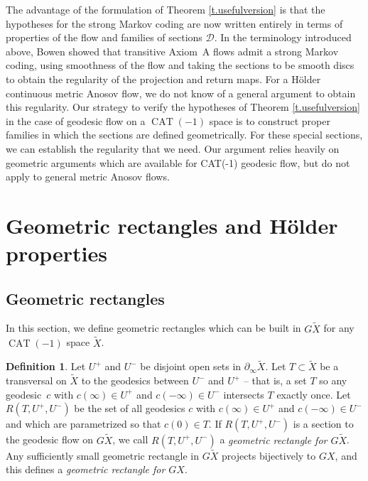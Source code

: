 \documentclass[JEP,XML,SOM,Unicode,NoFloatCountersInSection]{cedram}
\let\mathcal\mathscr
\theoremstyle{definition}
\newtheorem{defn}[thm]{Definition}
\numberwithin{equation}{section}
\DeclareMathOperator{\CAT}{CAT}
\newcommand\DDD{\mathcal D}
\begin{document}
The advantage of the formulation of Theorem \ref{t.usefulversion} is that the hypotheses for the strong Markov coding are now written entirely in terms of properties of the flow and families of sections $\DDD$. In the terminology introduced above, Bowen showed that transitive Axiom~A flows admit a strong Markov coding, using smoothness of the flow and taking the sections to be smooth discs to obtain the regularity of the projection and return maps. For a Hölder continuous metric Anosov flow, we do not know of a general argument to obtain this regularity. Our strategy to verify the hypotheses of Theorem \ref{t.usefulversion} in the case of geodesic flow on a $\CAT(-1)$ space is to construct proper families in which the sections are defined geometrically. For these special sections, we can establish the regularity that we need. Our argument relies heavily on geometric arguments which are available for CAT(-1) geodesic flow, but do not apply to general metric Anosov flows.

\section{Geometric rectangles and Hölder properties}\label{sec:good rectangles}

\subsection{Geometric rectangles} \label{subsec:geom rect}

In this section, we define geometric rectangles which can be built in $G\tilde X$ for any $\CAT(-1)$ space $\tilde X$.

\begin{defn}\label{def:geom rectangle}
Let $U^+$ and $U^-$ be disjoint open sets in $\partial_\infty \tilde X$. Let $T \subset \tilde X$ be a transversal on $\tilde X$ to the geodesics between $U^-$ and $U^+$ -- that is, a set $T$ so any geodesic~$c$ with $c(\infty)\in U^+$ and $c(-\infty) \in U^-$ intersects $T$ exactly once. Let $R(T, U^+, U^-)$ be the set of all geodesics $c$ with $c(\infty)\in U^+$ and $c(-\infty) \in U^-$ and which are parametrized so that $c(0)\in T$. If $R(T,U^+,U^-)$ is a section to the geodesic flow on $G \tilde X$, we call $R(T,U^+,U^-)$ a \emph{geometric rectangle for $G\tilde X$}. Any sufficiently small geometric rectangle in $G\tilde X$ projects bijectively to $GX$, and this defines a \emph{geometric rectangle for $GX$}.
\end{defn}
\end{document}
